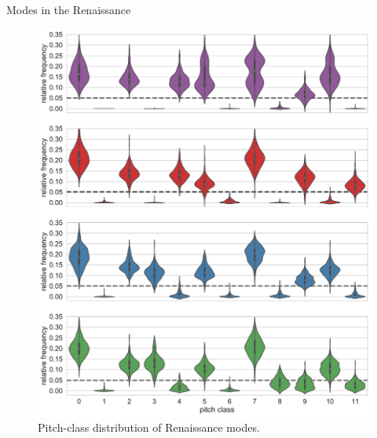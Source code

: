 \begin{frame}{Modes in the Renaissance}
    \begin{figure}
        \includegraphics[width=\linewidth,height=.8\textheight,keepaspectratio]{img/Figure7.pdf}
        \caption{Pitch-class distribution of Renaissance modes.}
    \end{figure}
\end{frame}